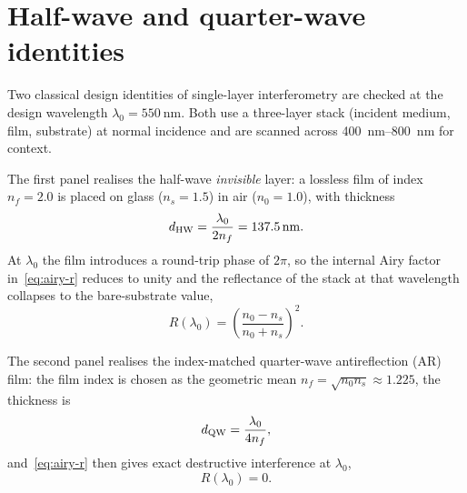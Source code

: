 \section{Half-wave and quarter-wave identities}

Two classical design identities of single-layer interferometry are checked
at the design wavelength $\lambda_0 = \SI{550}{\nano\metre}$. Both use a
three-layer stack (incident medium, film, substrate) at normal incidence
and are scanned across \SIrange{400}{800}{\nano\metre} for context.

The first panel realises the half-wave \emph{invisible} layer: a lossless
film of index $n_f = 2.0$ is placed on glass ($n_s = 1.5$) in air
($n_0 = 1.0$), with thickness
\begin{equation}
  d_{\rm HW} = \frac{\lambda_0}{2 n_f} = \SI{137.5}{\nano\metre}. \label{eq:hw-d}
\end{equation}
At $\lambda_0$ the film introduces a round-trip phase of $2\pi$, so the
internal Airy factor in~\eqref{eq:airy-r} reduces to unity and the
reflectance of the stack at that wavelength collapses to the bare-substrate
value,
\begin{equation}
  R(\lambda_0) = \left(\frac{n_0 - n_s}{n_0 + n_s}\right)^{2}. \label{eq:hw-R}
\end{equation}

The second panel realises the index-matched quarter-wave antireflection
(AR) film: the film index is chosen as the geometric mean
$n_f = \sqrt{n_0 n_s} \approx 1.225$, the thickness is
\begin{equation}
  d_{\rm QW} = \frac{\lambda_0}{4 n_f}, \label{eq:qw-d}
\end{equation}
and~\eqref{eq:airy-r} then gives exact destructive interference at
$\lambda_0$,
\begin{equation}
  R(\lambda_0) = 0. \label{eq:qw-R}
\end{equation}

\begin{center}
\end{center}

